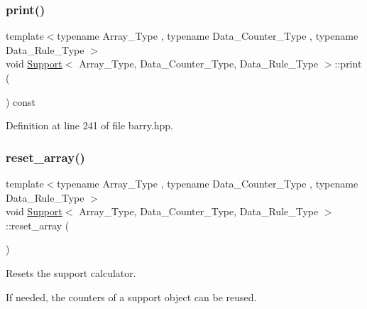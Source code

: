 \mbox{\label{classbarry_1_1_support_af87b2e85ec72e394387946023508e7fd}} 
\subsubsection{\texorpdfstring{print()}{print()}}
{\footnotesize\ttfamily template$<$typename Array\+\_\+\+Type , typename Data\+\_\+\+Counter\+\_\+\+Type , typename Data\+\_\+\+Rule\+\_\+\+Type $>$ \\
void \hyperlink{classbarry_1_1_support}{Support}$<$ Array\+\_\+\+Type, Data\+\_\+\+Counter\+\_\+\+Type, Data\+\_\+\+Rule\+\_\+\+Type $>$\+::print (\begin{DoxyParamCaption}{ }\end{DoxyParamCaption}) const\hspace{0.3cm}{\ttfamily [inline]}}



Definition at line 241 of file barry.\+hpp.

\mbox{\label{classbarry_1_1_support_a4f2860fd2e8e30703b91633a92ed7a58}} 
\subsubsection{\texorpdfstring{reset\+\_\+array()}{reset\_array()}\hspace{0.1cm}{\footnotesize\ttfamily [1/2]}}
{\footnotesize\ttfamily template$<$typename Array\+\_\+\+Type , typename Data\+\_\+\+Counter\+\_\+\+Type , typename Data\+\_\+\+Rule\+\_\+\+Type $>$ \\
void \hyperlink{classbarry_1_1_support}{Support}$<$ Array\+\_\+\+Type, Data\+\_\+\+Counter\+\_\+\+Type, Data\+\_\+\+Rule\+\_\+\+Type $>$\+::reset\+\_\+array (\begin{DoxyParamCaption}{ }\end{DoxyParamCaption})\hspace{0.3cm}{\ttfamily [inline]}}



Resets the support calculator. 

If needed, the counters of a support object can be reused.


